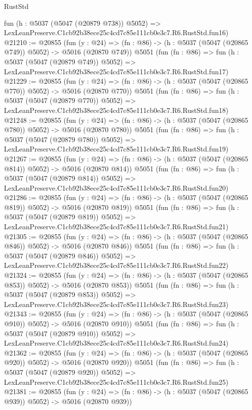 \begin{lexlean}{RustStd}
\begin{coremodule}
    fun (h : @5037 (@5047 (@20879 @738)) @5052) =>
    LexLeanPreserve.C1cb92b38ece25c4cd7c85e111cb0e3c7.R6.RustStd.fun16)
@21210 := @20855
    (fun (y : @24) => (fn : @86) -> (h : @5037 (@5047 (@20865 @749)) @5052) -> @5016 (@20870 @749))
    @5051
    (fun (fn : @86) =>
    fun (h : @5037 (@5047 (@20879 @749)) @5052) =>
    LexLeanPreserve.C1cb92b38ece25c4cd7c85e111cb0e3c7.R6.RustStd.fun17)
@21229 := @20855
    (fun (y : @24) => (fn : @86) -> (h : @5037 (@5047 (@20865 @770)) @5052) -> @5016 (@20870 @770))
    @5051
    (fun (fn : @86) =>
    fun (h : @5037 (@5047 (@20879 @770)) @5052) =>
    LexLeanPreserve.C1cb92b38ece25c4cd7c85e111cb0e3c7.R6.RustStd.fun18)
@21248 := @20855
    (fun (y : @24) => (fn : @86) -> (h : @5037 (@5047 (@20865 @780)) @5052) -> @5016 (@20870 @780))
    @5051
    (fun (fn : @86) =>
    fun (h : @5037 (@5047 (@20879 @780)) @5052) =>
    LexLeanPreserve.C1cb92b38ece25c4cd7c85e111cb0e3c7.R6.RustStd.fun19)
@21267 := @20855
    (fun (y : @24) => (fn : @86) -> (h : @5037 (@5047 (@20865 @814)) @5052) -> @5016 (@20870 @814))
    @5051
    (fun (fn : @86) =>
    fun (h : @5037 (@5047 (@20879 @814)) @5052) =>
    LexLeanPreserve.C1cb92b38ece25c4cd7c85e111cb0e3c7.R6.RustStd.fun20)
@21286 := @20855
    (fun (y : @24) => (fn : @86) -> (h : @5037 (@5047 (@20865 @819)) @5052) -> @5016 (@20870 @819))
    @5051
    (fun (fn : @86) =>
    fun (h : @5037 (@5047 (@20879 @819)) @5052) =>
    LexLeanPreserve.C1cb92b38ece25c4cd7c85e111cb0e3c7.R6.RustStd.fun21)
@21305 := @20855
    (fun (y : @24) => (fn : @86) -> (h : @5037 (@5047 (@20865 @846)) @5052) -> @5016 (@20870 @846))
    @5051
    (fun (fn : @86) =>
    fun (h : @5037 (@5047 (@20879 @846)) @5052) =>
    LexLeanPreserve.C1cb92b38ece25c4cd7c85e111cb0e3c7.R6.RustStd.fun22)
@21324 := @20855
    (fun (y : @24) => (fn : @86) -> (h : @5037 (@5047 (@20865 @853)) @5052) -> @5016 (@20870 @853))
    @5051
    (fun (fn : @86) =>
    fun (h : @5037 (@5047 (@20879 @853)) @5052) =>
    LexLeanPreserve.C1cb92b38ece25c4cd7c85e111cb0e3c7.R6.RustStd.fun23)
@21343 := @20855
    (fun (y : @24) => (fn : @86) -> (h : @5037 (@5047 (@20865 @910)) @5052) -> @5016 (@20870 @910))
    @5051
    (fun (fn : @86) =>
    fun (h : @5037 (@5047 (@20879 @910)) @5052) =>
    LexLeanPreserve.C1cb92b38ece25c4cd7c85e111cb0e3c7.R6.RustStd.fun24)
@21362 := @20855
    (fun (y : @24) => (fn : @86) -> (h : @5037 (@5047 (@20865 @920)) @5052) -> @5016 (@20870 @920))
    @5051
    (fun (fn : @86) =>
    fun (h : @5037 (@5047 (@20879 @920)) @5052) =>
    LexLeanPreserve.C1cb92b38ece25c4cd7c85e111cb0e3c7.R6.RustStd.fun25)
@21381 := @20855
    (fun (y : @24) => (fn : @86) -> (h : @5037 (@5047 (@20865 @939)) @5052) -> @5016 (@20870 @939))

\end{coremodule}
\end{lexlean}
